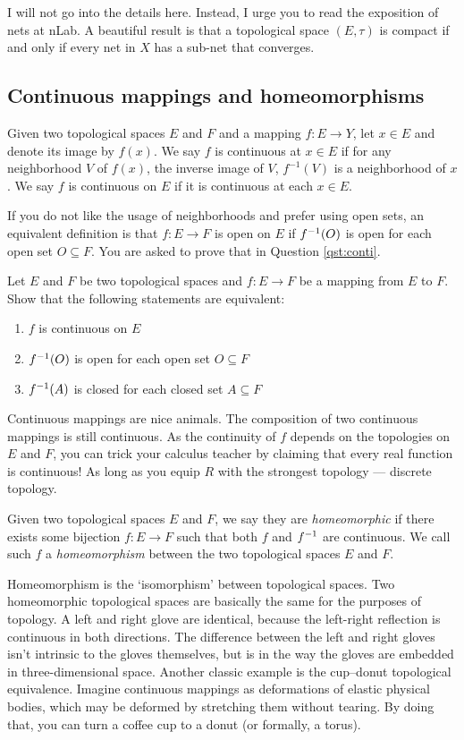 I will not go into the details here. Instead, I urge you to read the exposition of nets at nLab.
A beautiful result is that a topological space $(E,\tau)$ is compact if and only if every net in $X$ has a sub-net that converges.


\subsection{Continuous mappings and homeomorphisms}

Given two topological spaces $E$ and $F$ and a mapping $f: E \to Y$, let $x \in E$ and denote its image by $f(x)$.
We say $f$ is continuous at $x \in E$ if for any neighborhood $V$ of $f(x)$, 
the inverse image of $V$, $f^{-1}(V)$ is a neighborhood of $x$.
We say $f$ is continuous on $E$ if it is continuous at each $x \in E$.

If you do not like the usage of neighborhoods and prefer using open sets, 
an equivalent definition is that $f \colon E \to F$ is open on $E$ 
if $f ^{-1} (O)$ is open for each open set $O \subseteq F$.
You are asked to prove that in Question \ref{qst:conti}.

\begin{qst} \label{qst:conti}
  Let $E$ and $F$ be two topological spaces and $f: E\to F$ be a mapping from $E$ to $F$. Show that the following statements are equivalent:
  \begin{enumerate}
    \item $f$ is continuous on $E$
    \item $f ^{-1} (O)$ is open for each open set $O \subseteq F$
    \item $f ^{-1} (A)$ is closed for each closed set $A \subseteq F$ 
  \end{enumerate}
\end{qst} 

Continuous mappings are nice animals. The composition of two continuous mappings is still continuous.
As the continuity of $f$ depends on the topologies on $E$ and $F$,
you can trick your calculus teacher by claiming that every real function is continuous! As long as you equip $R$ with the strongest topology --- discrete topology.


Given two topological spaces $E$ and $F$, we say they are \textit{homeomorphic}
if there exists some bijection $f: E \to F$ such that both $f$ and
$f ^{-1}$ are continuous. We call such $f$ a \textit{homeomorphism}  between the two topological spaces $E$ and $F$.

Homeomorphism is the `isomorphism' between topological spaces.
Two homeomorphic topological spaces are basically the same for the purposes of topology.
A left and right glove are identical, because the left-right reflection is continuous in both directions. The difference between the left and right gloves isn't intrinsic to the gloves themselves, but is in the way the gloves are embedded in three-dimensional space.
Another classic example is the
cup--donut topological equivalence. 
Imagine continuous mappings as deformations of elastic physical bodies, which may be deformed by stretching them without tearing.
By doing that, you can turn a coffee cup to a donut (or formally, a torus). 

